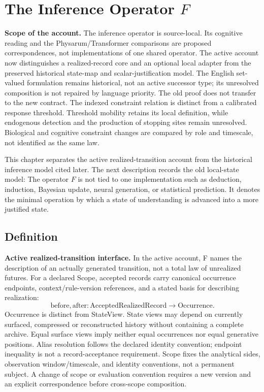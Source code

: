 \section{The Inference Operator $F$}

\noindent\textbf{Scope of the account.} The inference operator is source-local. Its cognitive reading and the Physarum/Transformer comparisons are proposed correspondences, not implementations of one shared operator. The active account now distinguishes a realized-record core and an optional local adapter from the preserved historical state-map and scalar-justification model. The English set-valued formulation remains historical, not an active successor type; its unresolved composition is not repaired by language priority. The old proof does not transfer to the new contract. The indexed constraint relation is distinct from a calibrated response threshold. Threshold mobility retains its local definition, while endogenous detection and the production of stopping sites remain unresolved. Biological and cognitive constraint changes are compared by role and timescale, not identified as the same law.


This chapter separates the active realized-transition account from the historical inference model cited later. The next description records the old local-state model: The operator $F$ is not tied to one implementation such as deduction, induction, Bayesian update, neural generation, or statistical prediction. It denotes the minimal operation by which a state of understanding is advanced into a more justified state.

\subsection{Definition}

\noindent\textbf{Active realized-transition interface.} In the active account, F names the description of an actually generated transition, not a total law of unrealized futures. For a declared Scope, accepted records carry canonical occurrence endpoints, context/rule-version references, and a stated basis for describing realization:
\[
\mathrm{before},\mathrm{after}:\mathrm{AcceptedRealizedRecord}\to\mathrm{Occurrence}.
\]
Occurrence is distinct from StateView. State views may depend on currently surfaced, compressed or reconstructed history without containing a complete archive. Equal surface views imply neither equal occurrences nor equal generative positions. Alias resolution follows the declared identity convention; endpoint inequality is not a record-acceptance requirement. Scope fixes the analytical sides, observation window/timescale, and identity conventions, not a permanent subject. A change of scope or evaluation convention requires a new version and an explicit correspondence before cross-scope composition.


